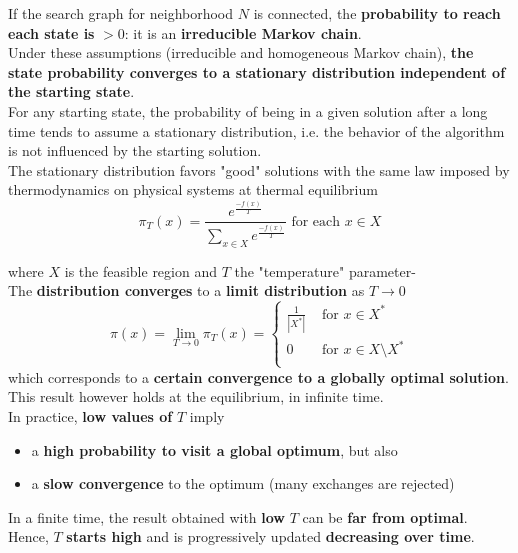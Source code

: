 \documentclass[11pt]{article}
\begin{document}
	If the search graph for neighborhood $N$ is connected, the \textbf{probability to reach each state is} $> 0$: it is an \textbf{irreducible Markov chain}.\\
	
	Under these assumptions (irreducible and homogeneous Markov chain), \textbf{the state probability converges to a stationary distribution independent of the starting state}. \\
	For any starting state, the probability of being in a given solution after a long time tends to assume a stationary distribution, i.e. the behavior of the algorithm is not influenced by the starting solution.\\
	
	
	The stationary distribution favors "good" solutions with the same law imposed by thermodynamics on physical systems at thermal equilibrium
	$$ \pi_T (x) = \frac{ e^{\frac{-f(x)}{T}} }{ \sum_{x \in X} e^{\frac{-f(x)}{T}} } \text{ for each } x \in X $$
	
	where $X$ is the feasible region and $T$ the "temperature" parameter-\\
	
	The \textbf{distribution converges} to a \textbf{limit distribution} as $T \rightarrow 0$
	$$ \pi (x) = \lim_{T \rightarrow 0} \pi_T (x) = \begin{cases}
		\frac{1}{|X^\ast|} & \text{ for } x \in X^\ast \\
		0 & \text{ for } x \in X \setminus X^\ast\\
	\end{cases}$$
	which corresponds to a \textbf{certain convergence to a globally optimal solution}.\\
	
	This result however holds at the equilibrium, in infinite time.\\
	
	In practice, \textbf{low values of} $T$ imply
	\begin{itemize}
		\item a \textbf{high probability to visit a global optimum}, but also
		\item a \textbf{slow convergence} to the optimum (many exchanges are rejected)
	\end{itemize}
	
	In a finite time, the result obtained with \textbf{low} $T$ can be \textbf{far from optimal}.\\
	Hence, $T$ \textbf{starts high} and is progressively updated \textbf{decreasing over time}.\\
	
\end{document}
